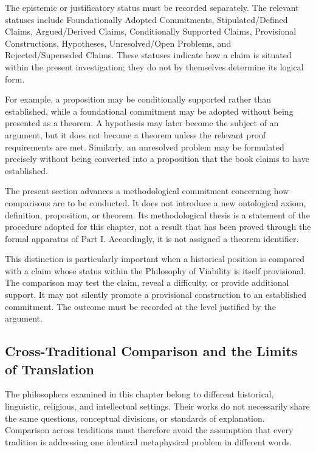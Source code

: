 \label{para:VS.B01.P01.C08.S01.SS07.P003}
The epistemic or justificatory status must be recorded
separately. The relevant statuses include
Foundationally Adopted Commitments,
Stipulated/Defined Claims, Argued/Derived Claims,
Conditionally Supported Claims, Provisional
Constructions, Hypotheses, Unresolved/Open Problems,
and Rejected/Superseded Claims. These statuses indicate
how a claim is situated within the present investigation;
they do not by themselves determine its logical form.

\label{para:VS.B01.P01.C08.S01.SS07.P004}
For example, a proposition may be conditionally
supported rather than established, while a foundational
commitment may be adopted without being presented as a
theorem. A hypothesis may later become the subject of
an argument, but it does not become a theorem unless
the relevant proof requirements are met. Similarly,
an unresolved problem may be formulated precisely
without being converted into a proposition that the
book claims to have established.

\label{para:VS.B01.P01.C08.S01.SS07.P005}
The present section advances a methodological
commitment concerning how comparisons are to be
conducted. It does not introduce a new ontological
axiom, definition, proposition, or theorem. Its
methodological thesis is a statement of the procedure
adopted for this chapter, not a result that has been
proved through the formal apparatus of Part I.
Accordingly, it is not assigned a theorem identifier.

\label{para:VS.B01.P01.C08.S01.SS07.P006}
This distinction is particularly important when a
historical position is compared with a claim whose
status within the Philosophy of Viability is itself
provisional. The comparison may test the claim, reveal
a difficulty, or provide additional support. It may
not silently promote a provisional construction to
an established commitment. The outcome must be
recorded at the level justified by the argument.

\subsection{Cross-Traditional Comparison and the Limits of Translation}
\label{sec:ch08-s01-ss08}

\label{para:VS.B01.P01.C08.S01.SS08.P001}
The philosophers examined in this chapter belong to
different historical, linguistic, religious, and
intellectual settings. Their works do not necessarily
share the same questions, conceptual divisions, or
standards of explanation. Comparison across traditions
must therefore avoid the assumption that every
tradition is addressing one identical metaphysical
problem in different words.

